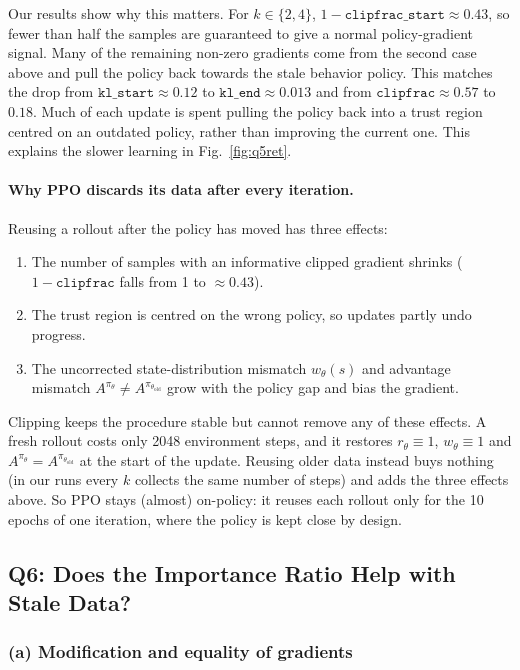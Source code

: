 \documentclass[11pt]{article}
\newcommand{\piold}{\pi_{\theta_{\mathrm{old}}}}
\newcommand{\code}[1]{\texttt{#1}}
\begin{document}
Our results show why this matters. For $k\in\{2,4\}$, $1-\code{clipfrac\_start}\approx0.43$, so
fewer than half the samples are guaranteed to give a normal policy-gradient signal. Many of the
remaining non-zero gradients come from the second case above and pull the policy back towards the
stale behavior policy. This matches the drop from $\code{kl\_start}\approx0.12$ to
$\code{kl\_end}\approx0.013$ and from $\code{clipfrac}\approx0.57$ to $0.18$. Much of each update is
spent pulling the policy back into a trust region centred on an outdated policy, rather than
improving the current one. This explains the slower learning in Fig.~\ref{fig:q5ret}.

\paragraph{Why PPO discards its data after every iteration.}
Reusing a rollout after the policy has moved has three effects:
\begin{enumerate}
  \item The number of samples with an informative clipped gradient shrinks ($1-\code{clipfrac}$
        falls from 1 to $\approx0.43$).
  \item The trust region is centred on the wrong policy, so updates partly undo progress.
  \item The uncorrected state-distribution mismatch $w_\theta(s)$ and advantage mismatch
        $A^{\pi_\theta}\neq A^{\piold}$ grow with the policy gap and bias the gradient.
\end{enumerate}
Clipping keeps the procedure stable but cannot remove any of these effects. A fresh rollout costs
only 2048 environment steps, and it restores $r_\theta\equiv1$, $w_\theta\equiv1$ and
$A^{\pi_\theta}=A^{\piold}$ at the start of the update. Reusing older data instead buys nothing
(in our runs every $k$ collects the same number of steps) and adds the three effects above. So
PPO stays (almost) on-policy: it reuses each rollout only for the 10 epochs of one iteration,
where the policy is kept close by design.

\subsection*{Q6: Does the Importance Ratio Help with Stale Data?}

\subsubsection*{(a) Modification and equality of gradients}
\end{document}
